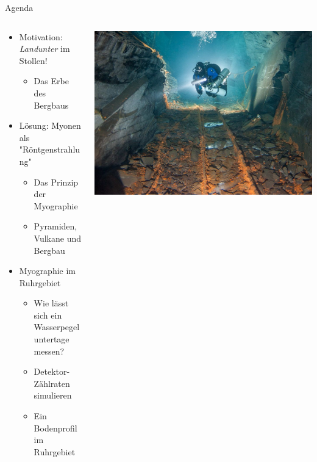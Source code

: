 \begin{frame}{Agenda}
	\begin{columns}[T]
		\begin{column}{.4\textwidth}
				\begin{itemize}
				    \item Motivation: \emph{Landunter} im Stollen!
				    \begin{itemize}
							\item[\to] Das Erbe des Bergbaus
					\end{itemize}
				    \item Lösung: Myonen als "Röntgenstrahlung"
				    \begin{itemize}
				            \item Das Prinzip der Myographie
							\item[\to] Pyramiden, Vulkane und Bergbau 
					\end{itemize}
					\item Myographie im Ruhrgebiet
				    \begin{itemize}
							\item Wie lässt sich ein Wasserpegel untertage messen?
				    		\item Detektor-Zählraten simulieren
				    		\item Ein Bodenprofil im Ruhrgebiet
					\end{itemize}
					
				\end{itemize}
		\end{column}
		\begin{column}{.5\textwidth}
				\includegraphics[width=\textwidth]{images/wasser_stollen.jpg}
		\end{column}
	\end{columns}
\end{frame}
